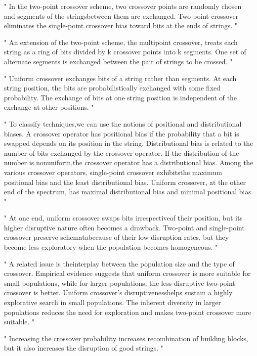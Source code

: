 "
In the two-point crossover scheme, two crossover points are randomly chosen and segments of the stringsbetween them are exchanged. Two-point crossover eliminates the single-point crossover bias toward bits at the ends of strings.
"\cite{srinivas_genetic_1994}

"
An extension of the two-point scheme, the multipoint crossover, treats each string as a ring of bits divided by k crossover points into k segments. One set of alternate segments is exchanged between the pair of strings to be crossed.
"\cite{srinivas_genetic_1994}

"
Uniform crossover exchanges bits of a string rather than segments. At each string position, the bits are probabilistically exchanged with some fixed probability. The exchange of bits at one string position is independent of the exchange at other positions.
"\cite{srinivas_genetic_1994}

"
To classify techniques,we can use the notions of positional and distributional biases. A crossover operator has positional bias if the probability that a bit is swapped depends on its position in the string. Distributional bias is related to the number of bits exchanged by the crossover operator. If the distribution of the number is nonuniform,the crossover operator has a distributional bias. Among the various crossover operators, single-point crossover exhibitsthe maximum positional bias and the least distributional bias. Uniform crossover, at the other end of the spectrum, has maximal distributional bias and minimal positional bias.
"\cite{srinivas_genetic_1994}

"
At one end, uniform crossover swaps bits irrespectiveof their position, but its higher disruptive nature often becomes a drawback. Two-point and single-point crossover preserve schematabecause of their low disruption rates, but they become less exploratory when the population becomes homogeneous.
"\cite{srinivas_genetic_1994}

"
A related issue is theinterplay between the population size and the type of crossover. Empirical evidence suggests that uniform crossover is more suitable for small populations, while for larger populations, the less disruptive two-point crossover is better. Uniform crossover’s disruptivenesshelps sustain a highly explorative search in small populations. The inherent diversity in larger populations reduces the need for exploration and makes two-point crossover more suitable.
"\cite{srinivas_genetic_1994}

"
Increasing the crossover probability increases recombination of building blocks, but it also increases the disruption of good strings.
"\cite{srinivas_genetic_1994}

